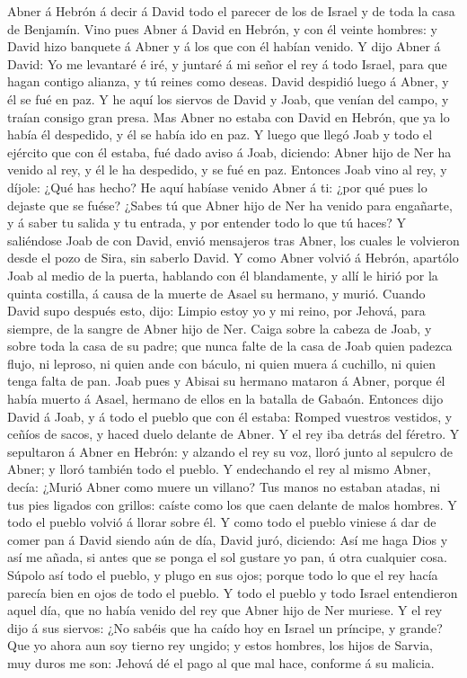 Abner á Hebrón á decir á David todo el parecer de los de Israel y de
toda la casa de Benjamín.  Vino pues Abner á David en
Hebrón, y con él veinte hombres: y David hizo banquete á Abner y á los
que con él habían venido.  Y dijo Abner á David: Yo me
levantaré é iré, y juntaré á mi señor el rey á todo Israel, para que
hagan contigo alianza, y tú reines como deseas. David despidió luego á
Abner, y él se fué en paz.  Y he aquí los siervos de David
y Joab, que venían del campo, y traían consigo gran presa. Mas Abner no
estaba con David en Hebrón, que ya lo había él despedido, y él se había
ido en paz.  Y luego que llegó Joab y todo el ejército que
con él estaba, fué dado aviso á Joab, diciendo: Abner hijo de Ner ha
venido al rey, y él le ha despedido, y se fué en paz. 
Entonces Joab vino al rey, y díjole: ¿Qué has hecho? He aquí habíase
venido Abner á ti: ¿por qué pues lo dejaste que se fuése? 
¿Sabes tú que Abner hijo de Ner ha venido para engañarte, y á saber tu
salida y tu entrada, y por entender todo lo que tú haces? 
Y saliéndose Joab de con David, envió mensajeros tras Abner, los cuales
le volvieron desde el pozo de Sira, sin saberlo David.  Y
como Abner volvió á Hebrón, apartólo Joab al medio de la puerta,
hablando con él blandamente, y allí le hirió por la quinta costilla, á
causa de la muerte de Asael su hermano, y murió.  Cuando
David supo después esto, dijo: Limpio estoy yo y mi reino, por Jehová,
para siempre, de la sangre de Abner hijo de Ner.  Caiga
sobre la cabeza de Joab, y sobre toda la casa de su padre; que nunca
falte de la casa de Joab quien padezca flujo, ni leproso, ni quien ande
con báculo, ni quien muera á cuchillo, ni quien tenga falta de pan.
 Joab pues y Abisai su hermano mataron á Abner, porque él
había muerto á Asael, hermano de ellos en la batalla de Gabaón.
 Entonces dijo David á Joab, y á todo el pueblo que con él
estaba: Romped vuestros vestidos, y ceñíos de sacos, y haced duelo
delante de Abner. Y el rey iba detrás del féretro.  Y
sepultaron á Abner en Hebrón: y alzando el rey su voz, lloró junto al
sepulcro de Abner; y lloró también todo el pueblo.  Y
endechando el rey al mismo Abner, decía: ¿Murió Abner como muere un
villano?  Tus manos no estaban atadas, ni tus pies ligados
con grillos: caíste como los que caen delante de malos hombres. Y todo
el pueblo volvió á llorar sobre él.  Y como todo el pueblo
viniese á dar de comer pan á David siendo aún de día, David juró,
diciendo: Así me haga Dios y así me añada, si antes que se ponga el sol
gustare yo pan, ú otra cualquier cosa.  Súpolo así todo el
pueblo, y plugo en sus ojos; porque todo lo que el rey hacía parecía
bien en ojos de todo el pueblo.  Y todo el pueblo y todo
Israel entendieron aquel día, que no había venido del rey que Abner hijo
de Ner muriese.  Y el rey dijo á sus siervos: ¿No sabéis
que ha caído hoy en Israel un príncipe, y grande?  Que yo
ahora aun soy tierno rey ungido; y estos hombres, los hijos de Sarvia,
muy duros me son: Jehová dé el pago al que mal hace, conforme á su
malicia.

